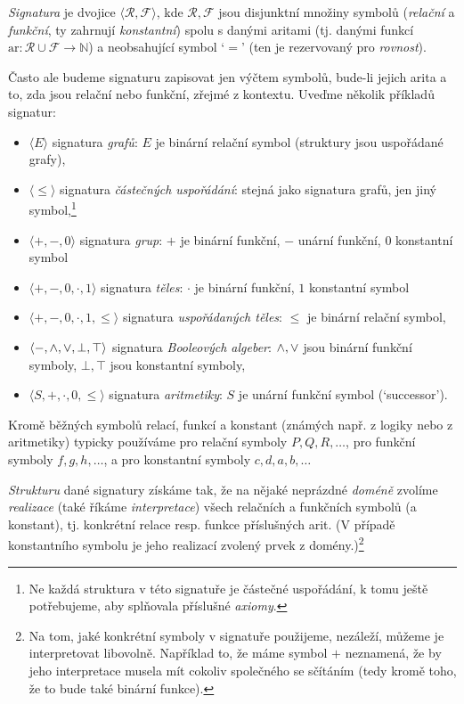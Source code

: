 \begin{definition}
    \emph{Signatura} je dvojice $\langle\mathcal R,\mathcal F\rangle$, kde $\mathcal R,\mathcal F$ jsou disjunktní množiny symbolů (\emph{relační} a \emph{funkční}, ty zahrnují \emph{konstantní}) spolu s danými aritami (tj. danými funkcí $\mathrm{ar}\colon \mathcal R\cup\mathcal F\to\mathbb N$) a neobsahující symbol `$=$' (ten je rezervovaný pro \emph{rovnost}). 
    
\end{definition}

Často ale budeme signaturu zapisovat jen výčtem symbolů, bude-li jejich arita a to, zda jsou relační nebo funkční, zřejmé z kontextu. Uveďme několik příkladů signatur:
\begin{itemize}
    \item $\langle E \rangle$ signatura \emph{grafů}: $E$ je binární relační symbol (struktury jsou uspořádané grafy),
    \item $\langle \leq \rangle$ signatura \emph{částečných uspořádání}: stejná jako signatura grafů, jen jiný symbol,\footnote{Ne každá struktura v této signatuře je částečné uspořádání, k tomu ještě potřebujeme, aby splňovala příslušné \emph{axiomy}.}
    \item $\langle +, -, 0\rangle$ signatura \emph{grup}: $+$ je binární funkční, $-$ unární funkční, $0$ konstantní symbol
    \item $\langle +, -, 0,\cdot,1\rangle$ signatura \emph{těles}: $\cdot$ je binární funkční, $1$ konstantní symbol
    \item $\langle +, -, 0,\cdot,1,\leq\rangle$ signatura \emph{uspořádaných těles}: $\leq$ je binární relační symbol,
    \item $\langle -,{\land},{\lor},\bot,\top\rangle$ signatura \emph{Booleových algeber}: ${\land},{\lor}$ jsou binární funkční symboly, $\bot,\top$ jsou konstantní symboly,
    \item $\langle S,+,\cdot,0,\leq\rangle$ signatura \emph{aritmetiky}: $S$ je unární funkční symbol (`successor').
\end{itemize}
Kromě běžných symbolů relací, funkcí a konstant (známých např. z logiky nebo z aritmetiky) typicky používáme pro relační symboly $P,Q,R,\dots$, pro funkční symboly $f,g,h,\dots$, a pro konstantní symboly $c,d,a,b,\dots$

\emph{Strukturu} dané signatury získáme tak, že na nějaké neprázdné \emph{doméně} zvolíme \emph{realizace} (také říkáme \emph{interpretace}) všech relačních a funkčních symbolů (a konstant), tj. konkrétní relace resp. funkce příslušných arit. (V případě konstantního symbolu je jeho realizací zvolený prvek z domény.)\footnote{Na tom, jaké konkrétní symboly v signatuře použijeme, nezáleží, můžeme je interpretovat libovolně. Například to, že máme symbol $+$ neznamená, že by jeho interpretace musela mít cokoliv společného se sčítáním (tedy kromě toho, že to bude také binární funkce).}


